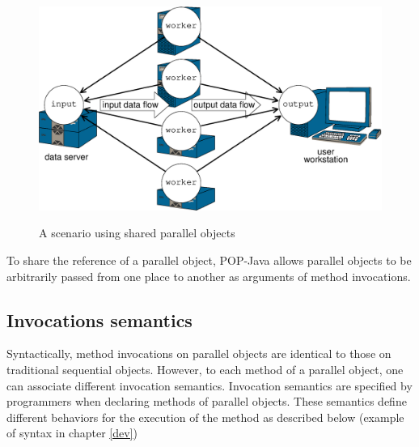 \begin{figure}[ht]
	\caption{A scenario using shared parallel objects}
  	\centering
	\includegraphics[scale=0.5]{fig_use_scenario.eps}
	\label{fig_use_scenario}
\end{figure}


To share the reference of a parallel object, POP-Java allows parallel objects
to be arbitrarily passed from one place to another as arguments of method
invocations.

\pagebreak
\subsection{Invocations semantics}
\label{semantic}
Syntactically, method invocations on parallel objects are identical to those
on traditional sequential objects. However, to each method of a parallel
object, one can associate different invocation semantics. Invocation
semantics are specified by programmers when declaring methods of
parallel objects. These semantics define different behaviors for the
execution of the method as described below (example of syntax in chapter \ref{dev})

